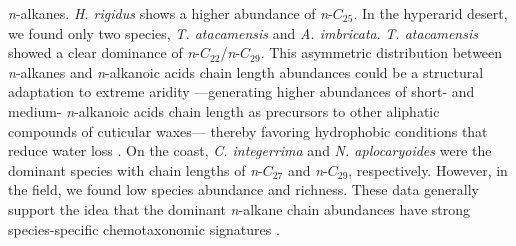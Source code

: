 \documentclass[
  authoryear,
  preprint,
  3p]{elsarticle}
\begin{document}
\emph{n}-alkanes. \emph{H. rigidus} shows a higher abundance of
\emph{n}-\(C_{25}\). In the hyperarid desert, we found only two species,
\emph{T. atacamensis} and \emph{A. imbricata}. \emph{T. atacamensis}
showed a clear dominance of \emph{n}-\(C_{22}\)/\emph{n}-\(C_{29}\).
This asymmetric distribution between \emph{n}-alkanes and
\emph{n}-alkanoic acids chain length abundances could be a structural
adaptation to extreme aridity ---generating higher abundances of short-
and medium- \emph{n}-alkanoic acids chain length as precursors to other
aliphatic compounds of cuticular waxes--- thereby favoring hydrophobic
conditions that reduce water loss
\citep{bushLeafWaxNalkane2013, contrerasLeafWaxComposition2022, mackovaPlantResponseDrought2013, shepherdEffectsStressPlant2006}.
On the coast, \emph{C. integerrima} and \emph{N. aplocaryoides} were the
dominant species with chain lengths of \emph{n}-\(C_{27}\) and
\emph{n}-\(C_{29}\), respectively. However, in the field, we found low
species abundance and richness. These data generally support the idea
that the dominant \emph{n}-alkane chain abundances have strong
species-specific chemotaxonomic signatures
\citep{cerda-penaMolecularNalkylLeaf2020}.


\renewcommand\refname{References}
  
\end{document}
